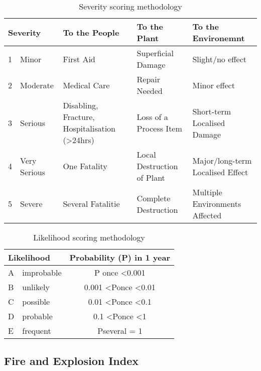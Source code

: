\begin{table}[H]
\centering
\caption{Severity scoring methodology}
\label{tab:severity-methodology}
\begin{tabularx}{\linewidth}{llXXX}
\toprule
\multicolumn{2}{l}{\textbf{Severity}} & \textbf{To the People}                                     & \textbf{To the Plant}      & \textbf{To the Environemnt}      \\ \midrule
1          & Minor             & First Aid                                                  & Superficial Damage         & Slight/no effect                 \\
2          & Moderate          & Medical Care                                               & Repair Needed              & Minor effect                     \\
3          & Serious           & Disabling, Fracture, Hospitalisation (\textgreater{}24hrs) & Loss of a Process Item     & Short-term Localised Damage      \\
4          & Very Serious      & One Fatality                                               & Local Destruction of Plant & Major/long-term Localised Effect \\
5          & Severe            & Several Fatalitie                                          & Complete Destruction       & Multiple Environments Affected   \\ \bottomrule
\end{tabularx}
\end{table}

\begin{table}[H]
\centering
\caption{Likelihood scoring methodology}
\label{tab:likelihood-methodology}
\begin{tabular}{llc}
\toprule
\multicolumn{2}{l}{Likelihood} & Probability (P) in 1 year              \\ \midrule
A & improbable & P once \textless   0.001               \\
B & unlikely   & 0.001 \textless Ponce   \textless 0.01 \\
C & possible   & 0.01 \textless Ponce   \textless 0.1   \\
D & probable   & 0.1 \textless Ponce   \textless 1      \\
E & frequent   & Pseveral   = 1                         \\ \bottomrule
\end{tabular}
\end{table}

\subsection{Fire and Explosion Index}

